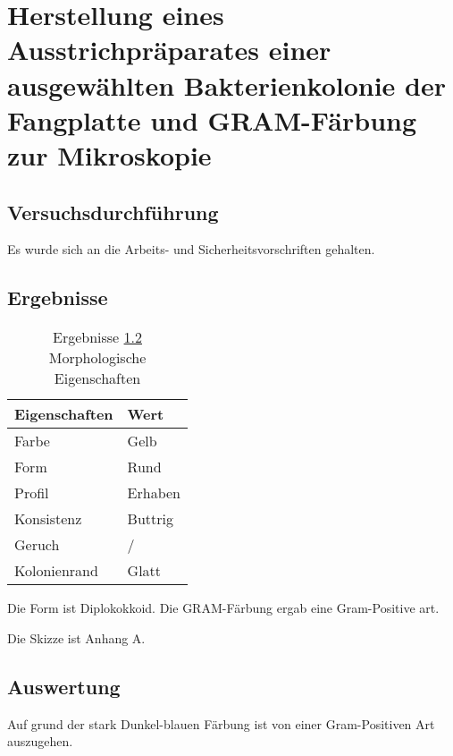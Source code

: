 
%

\section[Morphologische Eigenschaften \& GRAM-Färbung] {Herstellung eines Ausstrichpräparates einer ausgewählten Bakterienkolonie der Fangplatte und GRAM-Färbung zur Mikroskopie}
\label{sec:Gram}

\subsection{Versuchsdurchführung}
\label{sec:Gram-V}
Es wurde sich an die Arbeits- und Sicherheitsvorschriften gehalten.

\subsection{Ergebnisse}
\label{sec:Gram-E}

\begin{table}[h]
\centering
\caption{Ergebnisse \ref{sec:Gram-E} \\ 
Morphologische Eigenschaften}
\label{Tab:Gram-E}
\begin{tabular}{ll}
\hline
Eigenschaften & Wert    \\ \hline
Farbe         & Gelb    \\
Form          & Rund    \\
Profil        & Erhaben \\
Konsistenz    & Buttrig \\
Geruch        & /       \\
Kolonienrand  & Glatt   \\ \hline
\end{tabular}
\end{table}

Die Form ist Diplokokkoid.
Die GRAM-Färbung ergab eine Gram-Positive art.

Die Skizze ist Anhang A.

\subsection{Auswertung}
\label{sec:Gram-A}

Auf grund der stark Dunkel-blauen Färbung ist von einer Gram-Positiven Art auszugehen.

%